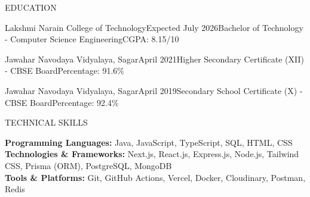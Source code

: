 \documentclass{resume}
\begin{document}
\begin{rSection}{EDUCATION}

\begin{rEducation}{Lakshmi Narain College of Technology}{Expected July 2026}{Bachelor of Technology - Computer Science Engineering}{CGPA: 8.15/10}
\end{rEducation}

\begin{rEducation}{Jawahar Navodaya Vidyalaya, Sagar}{April 2021}{Higher Secondary Certificate (XII) - CBSE Board}{Percentage: 91.6\%}
\end{rEducation}

\begin{rEducation}{Jawahar Navodaya Vidyalaya, Sagar}{April 2019}{Secondary School Certificate (X) - CBSE Board}{Percentage: 92.4\%}
\end{rEducation}

\end{rSection}

\begin{rSection}{TECHNICAL SKILLS}

\textbf{Programming Languages:} Java, JavaScript, TypeScript, SQL, HTML, CSS \\[2pt]
\textbf{Technologies \& Frameworks:} Next.js, React.js, Express.js, Node.js, Tailwind CSS, Prisma (ORM), PostgreSQL, MongoDB \\[2pt]
\textbf{Tools \& Platforms:} Git, GitHub Actions, Vercel, Docker, Cloudinary, Postman, Redis

\end{rSection}
\end{document}
